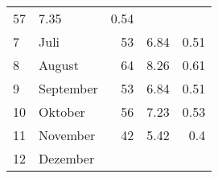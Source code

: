 \begin{longtable}{lXrrr}
       \num{57} &
       \num[round-mode=places,round-precision=2]{7.35} &
         \num[round-mode=places,round-precision=2]{0.54} \\

     7 &
     \multicolumn{1}{X}{ Juli   } &


       \num{53} &
       \num[round-mode=places,round-precision=2]{6.84} &
         \num[round-mode=places,round-precision=2]{0.51} \\

     8 &
     \multicolumn{1}{X}{ August   } &


       \num{64} &
       \num[round-mode=places,round-precision=2]{8.26} &
         \num[round-mode=places,round-precision=2]{0.61} \\

     9 &
     \multicolumn{1}{X}{ September   } &


       \num{53} &
       \num[round-mode=places,round-precision=2]{6.84} &
         \num[round-mode=places,round-precision=2]{0.51} \\

     10 &
     \multicolumn{1}{X}{ Oktober   } &


       \num{56} &
       \num[round-mode=places,round-precision=2]{7.23} &
         \num[round-mode=places,round-precision=2]{0.53} \\

     11 &
     \multicolumn{1}{X}{ November   } &


       \num{42} &
       \num[round-mode=places,round-precision=2]{5.42} &
         \num[round-mode=places,round-precision=2]{0.4} \\

     12 &
     \multicolumn{1}{X}{ Dezember   } &



\end{longtable}
